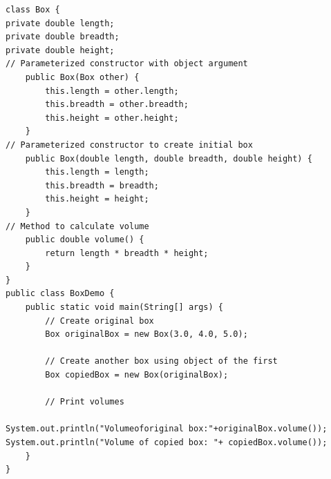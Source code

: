 \begin{verbatim}
class Box {
private double length;
private double breadth;
private double height;
// Parameterized constructor with object argument
    public Box(Box other) {
        this.length = other.length;
        this.breadth = other.breadth;
        this.height = other.height;
    }
// Parameterized constructor to create initial box
    public Box(double length, double breadth, double height) {
        this.length = length;
        this.breadth = breadth;
        this.height = height;
    }
// Method to calculate volume
    public double volume() {
        return length * breadth * height;
    }
}
public class BoxDemo {
    public static void main(String[] args) {
        // Create original box
        Box originalBox = new Box(3.0, 4.0, 5.0);

        // Create another box using object of the first
        Box copiedBox = new Box(originalBox);

        // Print volumes
       
System.out.println("Volumeoforiginal box:"+originalBox.volume());
System.out.println("Volume of copied box: "+ copiedBox.volume());
    }
}
\end{verbatim}